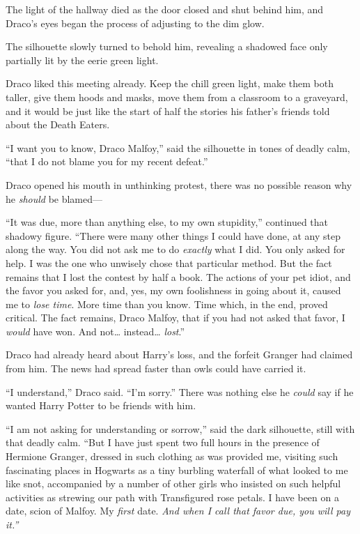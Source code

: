 The light of the hallway died as the door closed and shut behind him,
and Draco's eyes began the process of adjusting to the dim glow.

The silhouette slowly turned to behold him, revealing a shadowed face
only partially lit by the eerie green light.

Draco liked this meeting already. Keep the chill green light, make them
both taller, give them hoods and masks, move them from a classroom to a
graveyard, and it would be just like the start of half the stories his
father's friends told about the Death Eaters.

``I want you to know, Draco Malfoy,'' said the silhouette in tones of
deadly calm, ``that I do not blame you for my recent defeat.''

Draco opened his mouth in unthinking protest, there was no possible
reason why he \emph{should} be blamed---

``It was due, more than anything else, to my own stupidity,'' continued
that shadowy figure. ``There were many other things I could have done,
at any step along the way. You did not ask me to do \emph{exactly} what
I did. You only asked for help. I was the one who unwisely chose that
particular method. But the fact remains that I lost the contest by half
a book. The actions of your pet idiot, and the favor you asked for, and,
yes, my own foolishness in going about it, caused me to \emph{lose
time}. More time than you know. Time which, in the end, proved critical.
The fact remains, Draco Malfoy, that if you had not asked that favor, I
\emph{would} have won. And not\ldots{} instead\ldots{} \emph{lost}.''

Draco had already heard about Harry's loss, and the forfeit Granger had
claimed from him. The news had spread faster than owls could have
carried it.

``I understand,'' Draco said. ``I'm sorry.'' There was nothing else he
\emph{could} say if he wanted Harry Potter to be friends with him.

``I am not asking for understanding or sorrow,'' said the dark
silhouette, still with that deadly calm. ``But I have just spent two
full hours in the presence of Hermione Granger, dressed in such clothing
as was provided me, visiting such fascinating places in Hogwarts as a
tiny burbling waterfall of what looked to me like snot, accompanied by a
number of other girls who insisted on such helpful activities as
strewing our path with Transfigured rose petals. I have been on a date,
scion of Malfoy. My \emph{first} date. \emph{And when I call that favor
due, you will pay it.''}

